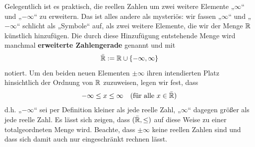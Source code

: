 \begin{de} 
    Gelegentlich ist es praktisch, die reellen Zahlen um zwei weitere Elemente „$\infty$“ und „$-\infty$“ zu erweitern. Das ist alles andere als mysteriös: wir fassen „$\infty$“ und „$-\infty$“ schlicht als „Symbole“ auf, als zwei weitere Elemente, die wir der Menge $\mathbb R$ künstlich hinzufügen. Die durch diese Hinzufügung entstehende Menge wird manchmal \textbf{erweiterte Zahlengerade} genannt und mit
        \[ \bar{\mathbb R} := \mathbb R\cup \{-\infty,\infty\} \]
    notiert. Um den beiden neuen Elementen $\pm \infty$ ihren intendierten Platz hinsichtlich der Ordnung von $\mathbb R$ zuzuweisen, legen wir fest, dass
        \begin{align*}
            -\infty \le  x \le \infty && (\text{für alle $x\in \bar {\mathbb R}$})
        \end{align*}
    d.h. „$-\infty$“ sei per Definition kleiner als jede reelle Zahl, „$\infty$“ dagegen größer als jede reelle Zahl. Es lässt sich zeigen, dass $(\bar {\mathbb R},\le)$ auf diese Weise zu einer totalgeordneten Menge wird. Beachte, dass $\pm \infty$ keine reellen Zahlen sind und dass sich damit auch nur eingeschränkt rechnen lässt.
\end{de}


